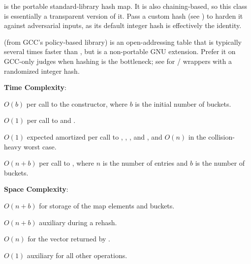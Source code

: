 \begin{compactitem}
  \item {} is the portable standard-library hash map. It is also chaining-based, so this class is essentially a transparent version of it. Pass a custom hash (see ) to harden it against adversarial inputs, as its default integer hash is effectively the identity.
  \item {} (from GCC's policy-based library) is an open-addressing table that is typically several times faster than , but is a non-portable GNU extension. Prefer it on GCC-only judges when hashing is the bottleneck; see  for / wrappers with a randomized integer hash.
\end{compactitem}

\textbf{Time Complexity}:
\begin{compactitem}
  \item $O(b)$ per call to the constructor, where $b$ is the initial number of buckets.
  \item $O(1)$ per call to  and .
  \item $O(1)$ expected amortized per call to , , , and , and $O(n)$ in the collision-heavy worst case.
  \item $O(n + b)$ per call to , where $n$ is the number of entries and $b$ is the number of buckets.
\end{compactitem}

\textbf{Space Complexity}:
\begin{compactitem}
  \item $O(n + b)$ for storage of the map elements and buckets.
  \item $O(n + b)$ auxiliary during a rehash.
  \item $O(n)$ for the vector returned by .
  \item $O(1)$ auxiliary for all other operations.
\end{compactitem}

